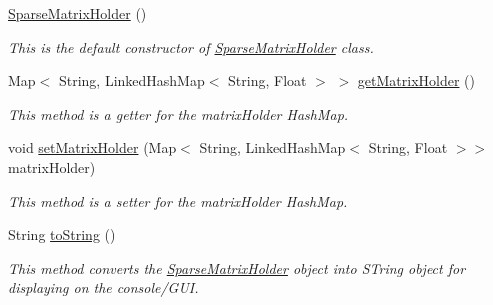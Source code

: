 \begin{DoxyCompactItemize}
\item 
\hypertarget{classese_1_1seas_1_1upenn_1_1edu_1_1_sparse_matrix_holder_a53e71fa302066a4bd438da07367a6f41}{}\hyperlink{classese_1_1seas_1_1upenn_1_1edu_1_1_sparse_matrix_holder_a53e71fa302066a4bd438da07367a6f41}{Sparse\+Matrix\+Holder} ()\label{classese_1_1seas_1_1upenn_1_1edu_1_1_sparse_matrix_holder_a53e71fa302066a4bd438da07367a6f41}

\begin{DoxyCompactList}\small\item\em This is the default constructor of \hyperlink{classese_1_1seas_1_1upenn_1_1edu_1_1_sparse_matrix_holder}{Sparse\+Matrix\+Holder} class. \end{DoxyCompactList}\item 
\hypertarget{classese_1_1seas_1_1upenn_1_1edu_1_1_sparse_matrix_holder_af4939e0fb08c94f4449078f520bdede6}{}Map$<$ String, Linked\+Hash\+Map$<$ String, Float $>$ $>$ \hyperlink{classese_1_1seas_1_1upenn_1_1edu_1_1_sparse_matrix_holder_af4939e0fb08c94f4449078f520bdede6}{get\+Matrix\+Holder} ()\label{classese_1_1seas_1_1upenn_1_1edu_1_1_sparse_matrix_holder_af4939e0fb08c94f4449078f520bdede6}

\begin{DoxyCompactList}\small\item\em This method is a getter for the matrix\+Holder Hash\+Map. \end{DoxyCompactList}\item 
\hypertarget{classese_1_1seas_1_1upenn_1_1edu_1_1_sparse_matrix_holder_a20d7d37cfc84fb9468a1581a4f1168e0}{}void \hyperlink{classese_1_1seas_1_1upenn_1_1edu_1_1_sparse_matrix_holder_a20d7d37cfc84fb9468a1581a4f1168e0}{set\+Matrix\+Holder} (Map$<$ String, Linked\+Hash\+Map$<$ String, Float $>$$>$ matrix\+Holder)\label{classese_1_1seas_1_1upenn_1_1edu_1_1_sparse_matrix_holder_a20d7d37cfc84fb9468a1581a4f1168e0}

\begin{DoxyCompactList}\small\item\em This method is a setter for the matrix\+Holder Hash\+Map. \end{DoxyCompactList}\item 
\hypertarget{classese_1_1seas_1_1upenn_1_1edu_1_1_sparse_matrix_holder_aa236d3257451a1d086fb069abc0a1e32}{}String \hyperlink{classese_1_1seas_1_1upenn_1_1edu_1_1_sparse_matrix_holder_aa236d3257451a1d086fb069abc0a1e32}{to\+String} ()\label{classese_1_1seas_1_1upenn_1_1edu_1_1_sparse_matrix_holder_aa236d3257451a1d086fb069abc0a1e32}

\begin{DoxyCompactList}\small\item\em This method converts the \hyperlink{classese_1_1seas_1_1upenn_1_1edu_1_1_sparse_matrix_holder}{Sparse\+Matrix\+Holder} object into S\+Tring object for displaying on the console/\+G\+U\+I. \end{DoxyCompactList}\end{DoxyCompactItemize}


